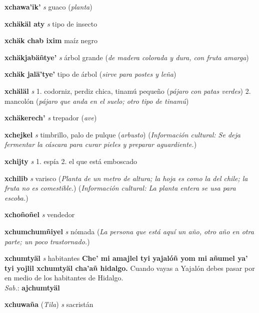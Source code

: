\documentclass[10pt]{scrbook}
\newcommand{\entry}[1]{\textbf{#1}}
\newcommand{\onedefinition}[1]{#1.}
\newcommand{\partofspeech}[1]{\textit{#1}}
\newcommand{\spanishtranslation}[1]{#1}
\newcommand{\clarification}[1]{(\textit{#1})}
\newcommand{\cholexample}[1]{\textbf{#1}}
\newcommand{\exampletranslation}[1]{#1}
\newcommand{\dialectvariant}[1]{\\\textit{#1}:}
\newcommand{\dialectword}[1]{\textbf{#1}}
\newcommand{\relevantdialect}[1]{(\textit{#1})}
\newcommand{\culturalinformation}[1]{(\textit{#1})}
\begin{document}
\begin{multicols}{2}
\entry{xchawa'ik'}
\partofspeech{s}
\spanishtranslation{guaco}
\clarification{planta}

\entry{xchäkäl aty}
\partofspeech{s}
\spanishtranslation{tipo de insecto}

\entry{xchäk chab ixim}
\spanishtranslation{maíz negro}

\entry{xchäkjabäñtye'}
\partofspeech{s}
\spanishtranslation{árbol grande}
\clarification{de madera colorada y dura, con fruta amarga}

\entry{xchäk jalä'tye'}
\spanishtranslation{tipo de árbol}
\clarification{sirve para postes y leña}

\entry{xchäläl}
\partofspeech{s}
\onedefinition{1}
\spanishtranslation{codorniz, perdiz chica, tinamú pequeño}
\clarification{pájaro con patas verdes}
\onedefinition{2}
\spanishtranslation{mancolón}
\clarification{pájaro que anda en el suelo; otro tipo de tinamú}

\entry{xchäkerech'}
\partofspeech{s}
\spanishtranslation{trepador}
\clarification{ave}

\entry{xchejkel}
\partofspeech{s}
\spanishtranslation{timbrillo, palo de pulque}
\clarification{arbusto}
\culturalinformation{Información cultural: Se deja fermentar la cáscara para curar pieles y preparar aguardiente.}

\entry{xchijty}
\partofspeech{s}
\onedefinition{1}
\spanishtranslation{espía}
\onedefinition{2}
\spanishtranslation{el que está emboscado}

\entry{xchilib}
\partofspeech{s}
\spanishtranslation{varisco}
\clarification{Planta de un metro de altura; la hoja es como la del chile; la fruta no es comestible.}
\culturalinformation{Información cultural: La planta entera se usa para escoba.}

\entry{xchoñoñel}
\partofspeech{s}
\spanishtranslation{vendedor}

\entry{xchumchumñiyel}
\partofspeech{s}
\spanishtranslation{nómada}
\clarification{La persona que está aquí un año, otro año en otra parte; un poco trastornado.}

\entry{xchumtyäl}
\partofspeech{s}
\spanishtranslation{habitantes}
\cholexample{Che' mi amajlel tyi yajalóñ yom mi añumel ya' tyi yojlil xchumtyäl cha'añ hidalgo.}
\exampletranslation{Cuando vayas a Yajalón debes pasar por en medio de los habitantes de Hidalgo.}
\dialectvariant{Sab.}
\dialectword{ajchumtyäl}

\entry{xchuwaña}
\relevantdialect{Tila}
\partofspeech{s}
\spanishtranslation{sacristán}


\end{multicols}
\end{document}

